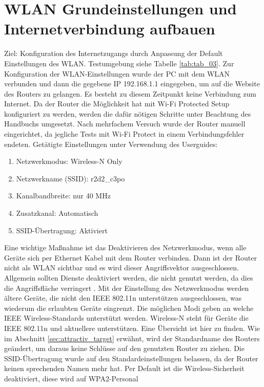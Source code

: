 	\section{WLAN Grundeinstellungen und Internetverbindung aufbauen}
	\label{w_wlan_settings}
	Ziel: Konfiguration des Internetzugangs durch Anpassung der Default 
	Einstellungen des WLAN.
	Testumgebung siehe Tabelle \ref{tab:tab_03}.
	\newline
	Zur Konfiguration der WLAN-Einstellungen wurde der PC mit dem WLAN verbunden
	und dann die gegebene IP 192.168.1.1 eingegeben, um auf die Website des
	Routers zu gelangen. Es besteht zu diesem Zeitpunkt keine Verbindung zum Internet.
	Da der Router die Möglichkeit hat mit Wi-Fi Protected Setup konfiguriert zu
	werden, werden die dafür nötigen Schritte unter Beachtung des Handbuchs 
	umgesetzt. Nach mehrfachem Versuch wurde der Router manuell eingerichtet,
	da jegliche Tests mit Wi-Fi Protect in einem Verbindungsfehler endeten.
	Getätigte Einstellungen unter Verwendung des Userguides:
	\begin{enumerate}
		\item Netzwerkmodus: Wireless-N Only
		\item Netzwerkname (SSID): r2d2\_c3po
		\item Kanalbandbreite: nur 40 MHz
		\item Zusatzkanal: Automatisch
		\item SSID-Übertragung: Aktiviert
	\end{enumerate}
	Eine wichtige Maßnahme ist das Deaktivieren des Netzwerkmodus, wenn alle Geräte
	sich per Ethernet Kabel mit dem Router verbinden. Dann ist der Router nicht
	als WLAN sichtbar und es wird dieser Angriffsvektor ausgeschlossen. Allgemein
	sollten Dienste deaktiviert werden, die nicht genutzt werden, da dies die
	Angriffsfläche verringert \cite{bsi}. Mit der Einstellung des Netzwerkmodus
	werden ältere Geräte, die nicht den IEEE 802.11n unterstützen ausgeschlossen,
	was wiederum die erlaubten Geräte eingrenzt. Die möglichen Modi geben an
	welche IEEE Wireless-Standards unterstützt werden. Wireless-N steht für
	Geräte die IEEE 802.11n und aktuellere unterstützen. Eine Übersicht ist hier
	\cite[S.54]{baun2025} zu finden. Wie im Abschnitt \ref{sec:attractiv_target} 
	erwähnt, wird der Standardname des Routers geändert, um daraus keine Schlüsse
	auf den genutzten Router zu ziehen. Die SSID-Übertragung wurde auf den
	Standardeinstellungen belassen, da der Router keinen sprechenden Namen mehr hat.
	Per Default ist die Wireless-Sicherheit deaktiviert, diese wird auf WPA2-Personal
